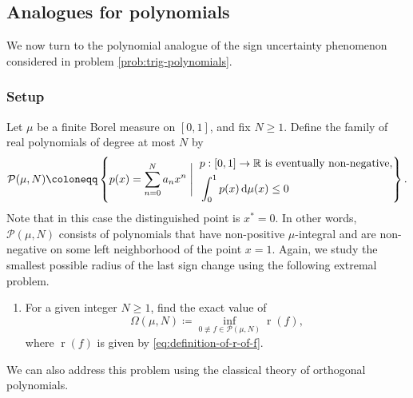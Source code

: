 \documentclass[reqno, a4paper]{amsart}
\def\R{\mathbb{R}}
\renewcommand{\d}{\text{\rm d}}
\renewcommand{\r}{\operatorname{r}}
\theoremstyle{plain}
\theoremstyle{definition}
\theoremstyle{remarkstyle}
\numberwithin{equation}{section}
\begin{document}
\subsection{Analogues for polynomials}\label{sec:extremal problem for polynomials}

We now turn to the polynomial analogue of the sign uncertainty phenomenon considered in problem \ref{prob:trig-polynomials}.

\subsubsection{Setup} Let $\mu$ be a finite Borel measure on $[0, 1]$, and fix $N \geq 1$.
Define the family of real polynomials of degree at most $N$ by
\begin{equation*}
    \mathcal{P}(\mu, N) \coloneqq \left\{ p(x) = \sum_{n=0}^N a_n x^n \;\Bigg|\;
    \begin{aligned}
        & \; p:[0, 1]\to \R \text{ is eventually non-negative}, \\
        & \; \int_{0}^{1} p(x)\, \d\mu(x) \leq 0
    \end{aligned}
    \right\}.
\end{equation*}
Note that in this case the distinguished point is $x^\ast=0$. In other words, $\mathcal{P}(\mu, N)$ consists of polynomials that have non-positive $\mu$-integral and are non-negative on some left neighborhood of the point $x=1$. Again, we study the smallest possible radius of the last sign change using the following extremal problem.
\begin{enumerate}[label=\textbf{(P\arabic*)}, ref=(P\arabic*), start=3]
    \item \label{prob:polynomials}
    For a given integer $N \geq 1$, find the exact value of
    \begin{equation*}
        \Omega(\mu, N) \coloneqq \inf_{0 \not\equiv f \in \mathcal{P}(\mu, N)} \r(f),
    \end{equation*}
    where $\r(f)$ is given by \eqref{eq:definition-of-r-of-f}.
\end{enumerate}
We can also address this problem using the classical theory of orthogonal polynomials.
\end{document}
